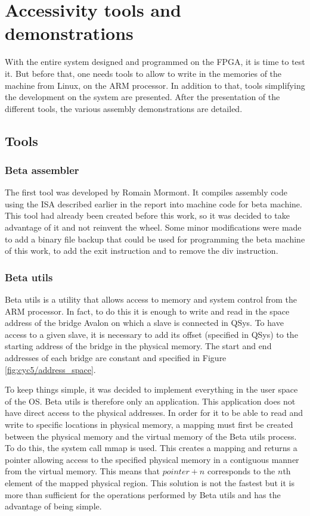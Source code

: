 \chapter{Accessivity tools and demonstrations}

With the entire system designed and programmed on the FPGA, it is time to test it. But before that, 
one needs tools to allow to write in the memories of the machine from Linux, on the ARM processor. 
In addition to that, tools simplifying the development on the system are presented. After the 
presentation of the different tools, the various assembly demonstrations are detailed.

\section{Tools}

\subsection{Beta assembler}

The first tool was developed by Romain Mormont. It compiles
assembly code using the ISA described earlier in the report into machine code for beta machine. This tool 
had already been created before this work, so it was decided to take advantage of it and not 
reinvent the wheel. Some minor modifications were made to add a binary file backup that could be 
used for programming the beta machine of this work, to add the exit instruction and to remove the 
div instruction.

\subsection{Beta utils}

Beta utils is a utility that allows access to memory and system control from the ARM processor. In 
fact, to do this it is enough to write and read in the space address of the bridge Avalon on which
a slave is connected in QSys. To have access to a given slave, it is necessary to add its offset 
(specified in QSys) to the starting address of the bridge in the physical memory. The start and end 
addresses of each bridge are constant and specified in Figure \ref{fig:cyc5/address_space}. 

To keep things simple, it was decided to implement everything in the user space of the OS. Beta 
utils is therefore only an application. This application does not have direct access to the 
physical addresses. In order for it to be able to read and write to specific locations in physical 
memory, a mapping must first be created between the physical memory and the virtual memory of the 
Beta utils process. To do this, the system call mmap is used. This creates a mapping and returns a 
pointer allowing access to the specified physical memory in a contiguous manner from the virtual 
memory. This means that $pointer + n$ corresponds to the $n$th element of the mapped physical region. 
This solution is not the fastest but it is more than sufficient for the operations performed by Beta 
utils and has the advantage of being simple. 

